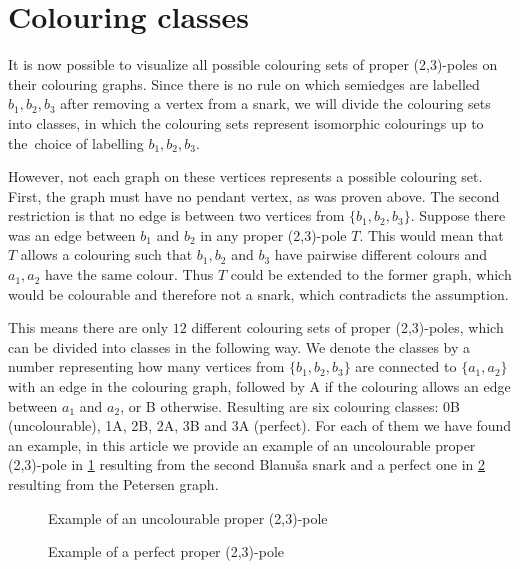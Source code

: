 \section{Colouring classes}\label{sec:colouring-classes}

It is now possible to visualize all possible colouring sets of proper (2,3)-poles on their colouring graphs. Since there is no rule on which semiedges are labelled $b_1,b_2,b_3$ after removing a vertex from a snark, we will divide the colouring sets into classes, in which the colouring sets represent isomorphic colourings up to the~choice of labelling $b_1,b_2,b_3$.

However, not each graph on these vertices represents a possible colouring set. First, the graph must have no pendant vertex, as was proven above. The second restriction is that no edge is between two vertices from $\{b_1,b_2,b_3\}$. Suppose there was an edge between $b_1$ and $b_2$ in any proper (2,3)-pole $T$. This would mean that $T$ allows a colouring such that $b_1,b_2$ and $b_3$ have pairwise different colours and $a_1,a_2$ have the same colour. Thus $T$ could be extended to the former graph, which would be colourable and therefore not a snark, which contradicts the assumption.

This means there are only $12$ different colouring sets of proper (2,3)-poles, which can be divided into classes in the following way. We denote the classes by a number representing how many vertices from $\{b_1,b_2,b_3\}$ are connected to $\{a_1,a_2\}$ with an edge in the colouring graph, followed by A if the colouring allows an edge between $a_1$ and $a_2$, or B otherwise. Resulting are six colouring classes: 0B (uncolourable), 1A, 2B, 2A, 3B and 3A (perfect). For each of them we have found an example, in this article we provide an example of an uncolourable proper (2,3)-pole in \cref{fig:uncolourable-example} resulting from the second Blanuša snark and a perfect one in \cref{fig:perfect-example} resulting from the Petersen graph.

\begin{figure}
	\centering
	\scalebox{0.7}{
		
	}
	\caption{Example of an uncolourable proper (2,3)-pole}
	\label{fig:uncolourable-example}
\end{figure}

\begin{figure}
	\centering
	
	\caption{Example of a perfect proper (2,3)-pole}
	\label{fig:perfect-example}
\end{figure}